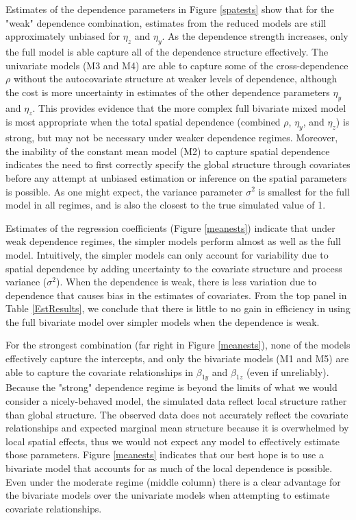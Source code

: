 \documentclass[12pt, a4paper, twoside]{article}
\begin{document}
Estimates of the dependence parameters in Figure \ref{spatests} show that for the "weak" dependence combination, estimates from the reduced models are still approximately unbiased for $\eta_z$ and $\eta_y$. As the dependence strength increases, only the full model is able capture all of the dependence structure effectively. The univariate models (M3 and M4) are able to capture some of the cross-dependence $\rho$ without the autocovariate structure at weaker levels of dependence, although the cost is more uncertainty in estimates of the other dependence parameters $\eta_y$ and $\eta_z$. This provides evidence that the more complex full bivariate mixed model is most appropriate when the total spatial dependence (combined $\rho$, $\eta_y$, and $\eta_z$) is strong, but may not be necessary under weaker dependence regimes. Moreover, the inability of the constant mean model (M2) to capture spatial dependence indicates the need to first correctly specify the global structure through covariates before any attempt at unbiased estimation or inference on the spatial parameters is possible. As one might expect, the variance parameter $\sigma^2$ is smallest for the full model in all regimes, and is also the closest to the true simulated value of 1.

Estimates of the regression coefficients (Figure \ref{meanests}) indicate that under weak dependence regimes, the simpler models perform almost as well as the full model. Intuitively, the simpler models can only account for variability due to spatial dependence by adding uncertainty to the covariate structure and process variance ($\sigma^2$). When the dependence is weak, there is less variation due to dependence that causes bias in the estimates of covariates. From the top panel in Table \ref{EstResults}, we conclude that there is little to no gain in efficiency in using the full bivariate model over simpler models when the dependence is weak.

For the strongest combination (far right in Figure \ref{meanests}), none of the models effectively capture the intercepts, and only the bivariate models (M1 and M5) are able to capture the covariate relationships in $\beta_{1y}$ and $\beta_{1z}$ (even if unreliably). Because the "strong" dependence regime is beyond the limits of what we would consider a nicely-behaved model, the simulated data reflect local structure rather than global structure. The observed data does not accurately reflect the covariate relationships and expected marginal mean structure because it is overwhelmed by local spatial effects, thus we would not expect any model to effectively estimate those parameters. Figure \ref{meanests} indicates that our best hope is to use a bivariate model that accounts for as much of the local dependence is possible. Even under the moderate regime (middle column) there is a clear advantage for the bivariate models over the univariate models when attempting to estimate covariate relationships.
\end{document}
